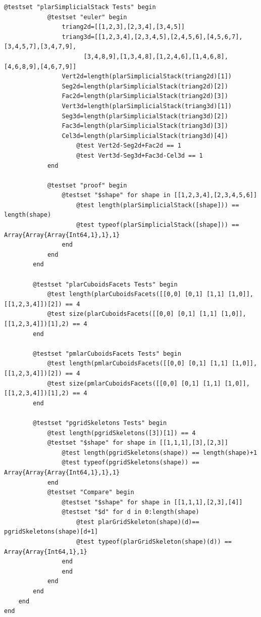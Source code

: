\documentclass{article}
\begin{document}
\begin{flushleft}
\begin{list}{}{}
\begin{Verbatim}[tabsize=4]
    	@testset "plarSimplicialStack Tests" begin
            @testset "euler" begin
    			triang2d=[[1,2,3],[2,3,4],[3,4,5]]
                triang3d=[[1,2,3,4],[2,3,4,5],[2,4,5,6],[4,5,6,7],[3,4,5,7],[3,4,7,9],
                      [3,4,8,9],[1,3,4,8],[1,2,4,6],[1,4,6,8],[4,6,8,9],[4,6,7,9]]
                Vert2d=length(plarSimplicialStack(triang2d)[1])
                Seg2d=length(plarSimplicialStack(triang2d)[2])
                Fac2d=length(plarSimplicialStack(triang2d)[3])
                Vert3d=length(plarSimplicialStack(triang3d)[1])
                Seg3d=length(plarSimplicialStack(triang3d)[2])
                Fac3d=length(plarSimplicialStack(triang3d)[3])
                Cel3d=length(plarSimplicialStack(triang3d)[4])
                    @test Vert2d-Seg2d+Fac2d == 1
                    @test Vert3d-Seg3d+Fac3d-Cel3d == 1
    		end
		
	    	@testset "proof" begin
		    	@testset "$shape" for shape in [[1,2,3,4],[2,3,4,5,6]]
			    	@test length(plarSimplicialStack([shape])) == length(shape)
				    @test typeof(plarSimplicialStack([shape])) ==  Array{Array{Array{Int64,1},1},1}
			    end
		    end
    	end	
	
	    @testset "plarCuboidsFacets Tests" begin
		    @test length(plarCuboidsFacets([[0,0] [0,1] [1,1] [1,0]], [[1,2,3,4]])[2]) == 4
    		@test size(plarCuboidsFacets([[0,0] [0,1] [1,1] [1,0]], [[1,2,3,4]])[1],2) == 4 
    	end
	
    	@testset "pmlarCuboidsFacets Tests" begin
    		@test length(pmlarCuboidsFacets([[0,0] [0,1] [1,1] [1,0]], [[1,2,3,4]])[2]) == 4
    		@test size(pmlarCuboidsFacets([[0,0] [0,1] [1,1] [1,0]], [[1,2,3,4]])[1],2) == 4 
    	end

    	@testset "pgridSkeletons Tests" begin
            @test length(pgridSkeletons([3])[1]) == 4
          	@testset "$shape" for shape in [[1,1,1],[3],[2,3]]
    			@test length(pgridSkeletons(shape)) == length(shape)+1
    			@test typeof(pgridSkeletons(shape)) == Array{Array{Array{Int64,1},1},1}
    		end
    		@testset "Compare" begin
    			@testset "$shape" for shape in [[1,1,1],[2,3],[4]]
    			@testset "$d" for d in 0:length(shape)
    				@test plarGridSkeleton(shape)(d)== pgridSkeletons(shape)[d+1] 
    				@test typeof(plarGridSkeleton(shape)(d)) == Array{Array{Int64,1},1}
    			end
    			end
    		end
    	end
    end
end

\end{Verbatim}
\end{list}
\end{flushleft}
\end{document}
